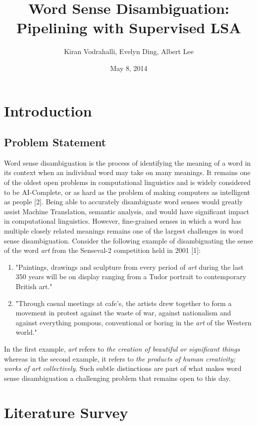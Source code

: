 \documentclass[10pt, letterpaper]{article}
\author{Kiran Vodrahalli, Evelyn Ding, Albert Lee}
\title{Word Sense Disambiguation: Pipelining with Supervised LSA}
\date{May 8, 2014}
\begin{document}
	\maketitle
	
	\section{Introduction}
	\subsection{Problem Statement}
	Word sense disambiguation is the process of identifying the meaning of a word in its context when an individual word may take on many meanings.
	It remains one of the oldest open problems in computational linguistics and is widely considered to be AI-Complete, 
	or as hard as the problem of making computers as intelligent as people [2]. Being able to accurately disambiguate word senses would greatly
	assist Machine Translation, semantic analysis, and would have significant impact in computational linguistics. However, fine-grained senses
	in which a word has multiple closely related meanings remains one of the largest challenges in word sense disambiguation. Consider the following
	example of disambiguating the sense of the word {\emph {art}} from the Senseval-2 competition held in 2001 [1]:
	\begin{enumerate}
	\item "Paintings, drawings and sculpture from every period of {\emph {art}} during the last 350 years will be on display ranging from a Tudor portrait to contemporary British art."
	\item "Through casual meetings at cafe's, the artists drew together to form a movement in protest against the waste of war, against nationalism and against everything pompous, conventional or boring in the {\emph {art}} of the Western world."
	\end{enumerate}
	In the first example, {\emph {art}} refers to {\emph {the creation of beautiful or significant things}} whereas in the second example, it refers to {\emph {the products of human creativity; works of art collectively}}. Such subtle distinctions are part of what makes word sense disambiguation a challenging problem that remains open to this day.
	\section{Literature Survey}
        
\end{document}

